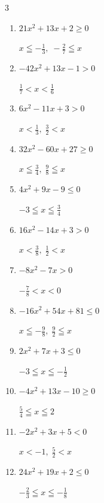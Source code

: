 \begin{multicols}{3}
\begin{enumerate}
  \item $21x^{2}+13x+2\geq 0$

        $\displaystyle x \leqq -\frac{1}{3} , \; -\frac{2}{7} \leqq x$

\columnbreak %

  \item $-42x^{2}+13x-1>0$

        $\displaystyle \frac{1}{7} < x < \frac{1}{6}$

  \item $6x^{2}-11x+3>0$

        $\displaystyle x < \frac{1}{3} , \; \frac{3}{2} < x$

  \item $32x^{2}-60x+27\geq 0$

        $\displaystyle x \leqq \frac{3}{4} , \; \frac{9}{8} \leqq x$

  \item $4x^{2}+9x-9\leq 0$

        $\displaystyle -3 \leqq x \leqq \frac{3}{4}$

  \item $16x^{2}-14x+3>0$

        $\displaystyle x < \frac{3}{8} , \; \frac{1}{2} < x$

  \item $-8x^{2}-7x>0$

        $\displaystyle -\frac{7}{8} < x < 0$

  \item $-16x^{2}+54x+81\leq 0$

        $\displaystyle x \leqq -\frac{9}{8} , \; \frac{9}{2} \leqq x$

  \item $2x^{2}+7x+3\leq 0$

        $\displaystyle -3 \leqq x \leqq -\frac{1}{2}$

  \item $-4x^{2}+13x-10\geq 0$

        $\displaystyle \frac{5}{4} \leqq x \leqq 2$

  \item $-2x^{2}+3x+5<0$

        $\displaystyle x < -1 , \; \frac{5}{2} < x$

\columnbreak %

  \item $24x^{2}+19x+2\leq 0$

        $\displaystyle -\frac{2}{3} \leqq x \leqq -\frac{1}{8}$


\end{enumerate}
\end{multicols}
